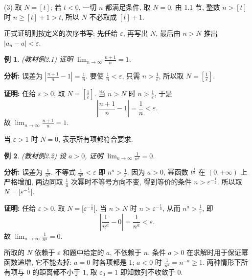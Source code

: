 \documentclass[UTF8,openany]{ctexbook}
\theoremstyle{chinesetextbook}
\newtheorem{example}{例}[section]
\newenvironment{cnproof}{\par\indent\textbf{证明:} \ignorespaces}{\par}
\begin{document}
(3) 取 $N=[t]$; 若 $t<0$, 一切 $n$ 都满足条件, 取 $N=0$. 由 1.1 节, 整数 $n>[t]$ 时 $n\ge[t]+1>t$, 所以 $N$ 不必取成 $[t]+1$.

正式证明则按定义的次序书写: 先任给 $\varepsilon$, 再写出 $N$, 最后由 $n>N$ 推出 $|a_n-a|<\varepsilon$.
\begin{example}\label{ex:2-1}
\textnormal{(教材例2.1)} 证明 $\displaystyle\lim_{n\to\infty}\frac{n+1}n=1$.
\end{example}
\par\indent\textbf{分析:} 误差为 $\displaystyle\left|\frac{n+1}n-1\right|=\frac1n$. 要使 $\displaystyle\frac1n<\varepsilon$, 只需 $\displaystyle n>\frac1\varepsilon$, 所以取 $\displaystyle N=\left[\frac1\varepsilon\right]$.
\begin{cnproof}
任给 $\varepsilon>0$, 取 $\displaystyle N=\left[\frac1\varepsilon\right]$. 当 $n>N$ 时 $\displaystyle n>\frac1\varepsilon$, 于是
\[
\left|\frac{n+1}n-1\right|=\frac1n<\varepsilon.
\]
故 $\displaystyle\lim_{n\to\infty}\frac{n+1}n=1$.
\end{cnproof}
当 $\varepsilon>1$ 时 $N=0$, 表示所有项都符合要求.
\begin{example}\label{ex:2-2}
\textnormal{(教材例2.2)} 设 $a>0$, 证明 $\displaystyle\lim_{n\to\infty}\frac1{n^a}=0$.
\end{example}
\par\indent\textbf{分析:} 误差为 $\displaystyle\frac1{n^a}$. 不等式 $\displaystyle\frac1{n^a}<\varepsilon$ 即 $\displaystyle n^a>\frac1\varepsilon$. 因为 $a>0$, 幂函数 $t^{\frac1a}$ 在 $(0,+\infty)$ 上严格增加, 两边同取 $\displaystyle\frac1a$ 次幂时不等号方向不变, 得到等价的条件 $n>\varepsilon^{-\frac1a}$. 所以取 $N=\bigl[\varepsilon^{-\frac1a}\bigr]$.
\begin{cnproof}
任给 $\varepsilon>0$, 取 $N=\bigl[\varepsilon^{-\frac1a}\bigr]$. 当 $n>N$ 时 $n>\varepsilon^{-\frac1a}$, 从而 $\displaystyle n^a>\frac1\varepsilon$, 即
\[
\left|\frac1{n^a}-0\right|=\frac1{n^a}<\varepsilon.
\]
故 $\displaystyle\lim_{n\to\infty}\frac1{n^a}=0$.
\end{cnproof}
所取的 $N$ 依赖于 $\varepsilon$ 和题中给定的 $a$, 不依赖于 $n$. 条件 $a>0$ 在求解时用于保证幂函数递增, 它不能去掉: $a=0$ 时各项都是 $1$; $a<0$ 时 $\displaystyle\frac1{n^a}=n^{-a}\ge1$. 两种情形下所有项与 $0$ 的距离都不小于 $1$, 取 $\varepsilon_0=1$ 即知数列不收敛于 $0$.
\end{document}
